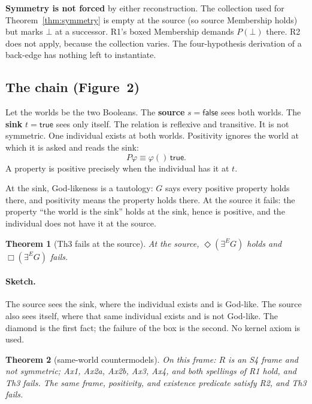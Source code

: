 \documentclass[11pt]{article}
\newtheorem{theorem}{Theorem}
\begin{document}
\textbf{Symmetry is not forced} by either reconstruction. The collection used for
Theorem~\ref{thm:symmetry} is empty at the source (so source Membership holds) but marks
\(\bot\) at a successor. R1's boxed Membership demands \(P(\bot)\) there. R2 does not apply,
because the collection varies. The four-hypothesis derivation of a back-edge has nothing
left to instantiate.

\subsection{The chain (Figure~2)}

Let the worlds be the two Booleans. The \textbf{source} \(s = \mathsf{false}\) sees both
worlds. The \textbf{sink} \(t = \mathsf{true}\) sees only itself. The relation is reflexive
and transitive. It is not symmetric. One individual exists at both worlds. Positivity
ignores the world at which it is asked and reads the sink:
\[
P\varphi \equiv \varphi()\,\mathsf{true}.
\]
A property is positive precisely when the individual has it at \(t\).

At the sink, God-likeness is a tautology: \(G\) says every positive property holds there,
and positivity means the property holds there. At the source it fails: the property ``the
world is the sink'' holds at the sink, hence is positive, and the individual does not have
it at the source.

\begin{theorem}[Th3 fails at the source]
\label{thm:th3fails}
At the source, \(\Diamond(\exists^E G)\) holds and \(\Box(\exists^E G)\) fails.
\end{theorem}

\paragraph{Sketch.}
The source sees the sink, where the individual exists and is God-like. The source also sees
itself, where that same individual exists and is not God-like. The diamond is the first
fact; the failure of the box is the second. No kernel axiom is used.

\begin{theorem}[same-world countermodels]
\label{thm:countermodels}
On this frame: \(R\) is an S4 frame and not symmetric; Ax1, Ax2a, Ax2b, Ax3, Ax4, and both
spellings of R1 hold, and Th3 fails. The same frame, positivity, and existence predicate
satisfy R2, and Th3 fails.
\end{theorem}
\end{document}
